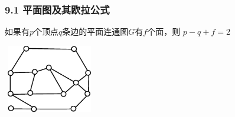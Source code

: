 \documentclass{beamer}
\begin{document}
\begin{CJK}{UTF8}{gbsn}
\begin{frame}
\end{frame}
\begin{frame}
  \frametitle{9.1 平面图及其欧拉公式}
  \begin{Thm}
    如果有$p$个顶点$q$条边的平面连通图$G$有$f$个面，则
      $p - q + f = 2$
  \end{Thm}
\vspace{1cm}
\centering
    \includegraphics[width=4cm,height=3cm]{euler}
\end{frame}


\end{CJK}
\end{document}
